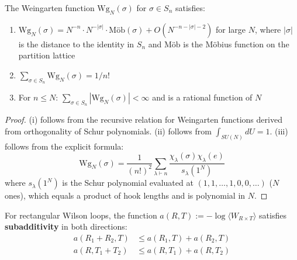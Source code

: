 \begin{lemma}
\label{lem:weingarten}
The Weingarten function $\text{Wg}_N(\sigma)$ for $\sigma \in S_n$ satisfies:
\begin{enumerate}[label=(\roman*)]
\item $\text{Wg}_N(\sigma) = N^{-n} \cdot N^{-|\sigma|} \cdot \text{M\"ob}(\sigma) + O(N^{-n-|\sigma|-2})$ 
for large $N$, where $|\sigma|$ is the distance to the identity in $S_n$ and 
$\text{M\"ob}$ is the M\"obius function on the partition lattice
\item $\sum_{\sigma \in S_n} \text{Wg}_N(\sigma) = 1/n!$
\item For $n \leq N$: $\sum_{\sigma \in S_n} |\text{Wg}_N(\sigma)| < \infty$ and is 
a rational function of $N$
\end{enumerate}
\end{lemma}

\begin{proof}
(i) follows from the recursive relation for Weingarten functions derived from 
orthogonality of Schur polynomials. (ii) follows from $\int_{SU(N)} dU = 1$. 
(iii) follows from the explicit formula:
\[
\text{Wg}_N(\sigma) = \frac{1}{(n!)^2} \sum_{\lambda \vdash n} \frac{\chi_\lambda(\sigma) \chi_\lambda(e)}{s_\lambda(1^N)}
\]
where $s_\lambda(1^N)$ is the Schur polynomial evaluated at $(1,1,\ldots,1,0,0,\ldots)$ 
($N$ ones), which equals a product of hook lengths and is polynomial in $N$.
\end{proof}

\begin{theorem}
\label{thm:wilson-mono}
For rectangular Wilson loops, the function $a(R,T) := -\log\langle W_{R \times T}\rangle$ 
satisfies \textbf{subadditivity} in both directions:
\begin{align}
a(R_1 + R_2, T) &\leq a(R_1, T) + a(R_2, T) \label{eq:subR}\\
a(R, T_1 + T_2) &\leq a(R, T_1) + a(R, T_2) \label{eq:subT}
\end{align}
\end{theorem}

